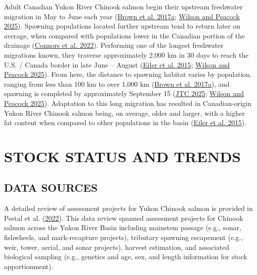 \documentclass[11pt]{book}
\begin{document}
Adult Canadian Yukon River Chinook salmon begin their upstream freshwater migration in May to June each year (\protect\hyperlink{ref-brown_catalog_2017}{Brown et al. 2017a}; \protect\hyperlink{ref-wilson2025}{Wilson and Peacock 2025}). Spawning populations located further upstream tend to return later on average, when compared with populations lower in the Canadian portion of the drainage (\protect\hyperlink{ref-connors2022}{Connors et al. 2022}). Performing one of the longest freshwater migrations known, they traverse approximately 2,000 km in 30 days to reach the U.S. / Canada border in late June -- August (\protect\hyperlink{ref-eiler2015migratory}{Eiler et al. 2015}; \protect\hyperlink{ref-wilson2025}{Wilson and Peacock 2025}). From here, the distance to spawning habitat varies by population, ranging from less than 100 km to over 1,000 km (\protect\hyperlink{ref-brown_catalog_2017}{Brown et al. 2017a}), and spawning is completed by approximately September 15 (\protect\hyperlink{ref-JTC2025Report}{JTC 2025}; \protect\hyperlink{ref-wilson2025}{Wilson and Peacock 2025}). Adaptation to this long migration has resulted in Canadian-origin Yukon River Chinook salmon being, on average, older and larger, with a higher fat content when compared to other populations in the basin (\protect\hyperlink{ref-eiler2015migratory}{Eiler et al. 2015}).

\hypertarget{stock-status-and-trends}{%
\section{STOCK STATUS AND TRENDS}\label{stock-status-and-trends}}

\hypertarget{data-sources}{%
\subsection{DATA SOURCES}\label{data-sources}}

A detailed review of assessment projects for Yukon Chinook salmon is provided in Pestal et al. (\protect\hyperlink{ref-pestal_review_2022}{2022}). This data review spanned assessment projects for Chinook salmon across the Yukon River Basin including mainstem passage (e.g., sonar, fishwheels, and mark-recapture projects), tributary spawning escapement (e.g., weir, tower, aerial, and sonar projects), harvest estimation, and associated biological sampling (e.g., genetics and age, sex, and length information for stock apportionment).
\end{document}
